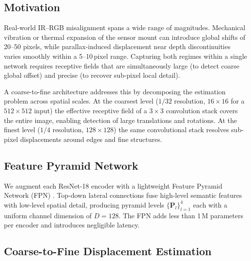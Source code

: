 \subsection{Motivation}
\label{subsec:multiscale_motivation}

Real-world IR--RGB misalignment spans a wide range of magnitudes.
Mechanical vibration or thermal expansion of the sensor mount can
introduce global shifts of 20--50 pixels, while parallax-induced
displacement near depth discontinuities varies smoothly within a
5--10\,pixel range.  Capturing both regimes within a single network
requires receptive fields that are simultaneously large (to detect coarse
global offset) and precise (to recover sub-pixel local detail).

A coarse-to-fine architecture addresses this by decomposing the estimation
problem across spatial scales.  At the coarsest level ($1/32$ resolution,
$16 \times 16$ for a $512 \times 512$ input) the effective receptive field
of a $3 \times 3$ convolution stack covers the entire image, enabling
detection of large translations and rotations.  At the finest level
($1/4$ resolution, $128 \times 128$) the same convolutional stack resolves
sub-pixel displacements around edges and fine structures.

\subsection{Feature Pyramid Network}
\label{subsec:fpn}

We augment each ResNet-18 encoder with a lightweight Feature Pyramid
Network (FPN) \cite{lin2017fpn}.  Top-down lateral connections fuse
high-level semantic features with low-level spatial detail, producing
pyramid levels $\{\mathbf{P}_l\}_{l=1}^{4}$ each with a uniform channel
dimension of $D{=}128$.  The FPN adds less than 1\,M parameters per
encoder and introduces negligible latency.

\subsection{Coarse-to-Fine Displacement Estimation}
\label{subsec:coarse_to_fine}

